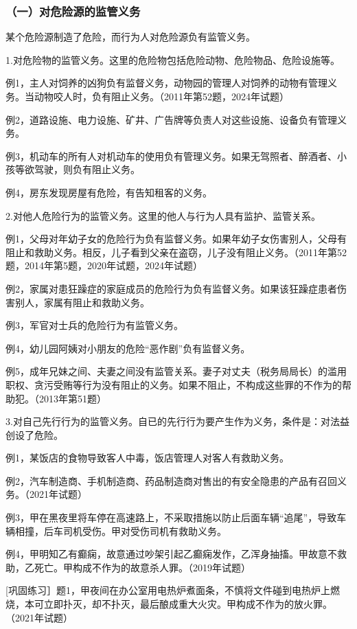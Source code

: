 \subsubsection*{（一）对危险源的监管义务}

某个危险源制造了危险，而行为人对危险源负有监管义务。

1.对危险物的监管义务。这里的危险物包括危险动物、危险物品、危险设施等。

例1，主人对饲养的凶狗负有监督义务，动物园的管理人对饲养的动物有管理义务。当动物咬人时，负有阻止义务。（2011年第52题，2024年试题）

例2，道路设施、电力设施、矿井、广告牌等负责人对这些设施、设备负有管理义务。

例3，机动车的所有人对机动车的使用负有管理义务。如果无驾照者、醉酒者、小孩等欲驾驶，则负有阻止义务。

例4，房东发现房屋有危险，有告知租客的义务。

2.对他人危险行为的监管义务。这里的他人与行为人具有监护、监管关系。

例1，父母对年幼子女的危险行为负有监督义务。如果年幼子女伤害别人，父母有阻止和救助义务。相反，儿子看到父亲在盗窃，儿子没有阻止义务。（2011年第52题，2014年第5题，2020年试题，2024年试题）

例2，家属对患狂躁症的家庭成员的危险行为负有监督义务。如果该狂躁症患者伤害别人，家属有阻止和救助义务。

例3，军官对士兵的危险行为有监管义务。

例4，幼儿园阿姨对小朋友的危险“恶作剧”负有监督义务。

例5，成年兄妹之间、夫妻之间没有监管关系。妻子对丈夫（税务局局长）的滥用职权、贪污受贿等行为没有阻止的义务。如果不阻止，不构成这些罪的不作为的帮助犯。（2013年第51题）

3.对自己先行行为的监管义务。自已的先行行为要产生作为义务，条件是：对法益创设了危险。

例1，某饭店的食物导致客人中毒，饭店管理人对客人有救助义务。

例2，汽车制造商、手机制造商、药品制造商对售出的有安全隐患的产品有召回义务。（2021年试题）

例3，甲在黑夜里将车停在高速路上，不采取措施以防止后面车辆“追尾”，导致车辆相撞，后车司机受伤。甲对受伤司机有救助义务。

例4，甲明知乙有癫痫，故意通过吵架引起乙癫痫发作，乙浑身抽搐。甲故意不救助，乙死亡。甲构成不作为的故意杀人罪。（2019年试题）

[巩固练习］题1，甲夜间在办公室用电热炉煮面条，不慎将文件碰到电热炉上燃烧，本可立即扑灭，却不扑灭，最后酿成重大火灾。甲构成不作为的放火罪。（2021年试题）

